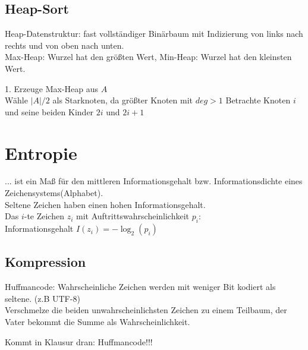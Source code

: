 \documentclass[10pt,a4paper]{scrartcl}
\begin{document}
\subsection{Heap-Sort}
Heap-Datenstruktur: fast vollständiger Binärbaum mit Indizierung von links nach rechts und von oben nach unten.\\
Max-Heap: Wurzel hat den größten Wert, Min-Heap: Wurzel hat den kleinsten Wert.

1. Erzeuge Max-Heap aus $A$\\
Wähle $|A| / 2$ als Starknoten, da größter Knoten mit $deg > 1$
Betrachte Knoten $i$ und seine beiden Kinder $2i$ und $2i+1$ \\






\section{Entropie}
... ist ein Maß für den mittleren Informationsgehalt bzw. Informationsdichte eines Zeichensystems(Alphabet).\\
Seltene Zeichen haben einen hohen Informationsgehalt.\\
Das $i$-te Zeichen $z_i$ mit Auftrittswahrscheinlichkeit $p_i$:\\
Informationsgehalt  $I(z_i) = -\log_2(p_i)$\\



	\subsection{Kompression}
	Huffmancode: Wahrscheinliche Zeichen werden mit weniger Bit kodiert als seltene. (z.B UTF-8)\\
	Verschmelze die beiden unwahrscheinlichsten Zeichen zu einem Teilbaum, der Vater bekommt die Summe als Wahrscheinlichkeit.
	
	
	Kommt in Klausur dran: Huffmancode!!!
\end{document}
